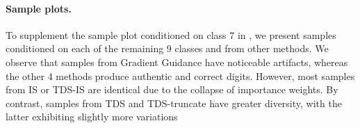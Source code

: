 \paragraph{Sample plots.} 
To supplement the sample plot conditioned on class $7$ in , we present samples conditioned on each of the remaining 9 classes and from other methods. We observe that samples from Gradient Guidance have noticeable artifacts, whereas the other 4 methods produce authentic and
correct digits. However, most samples from IS or TDS-IS are identical due to the collapse of importance weights. By contrast, samples from
TDS and TDS-truncate have greater diversity, with the latter exhibiting slightly more variations

